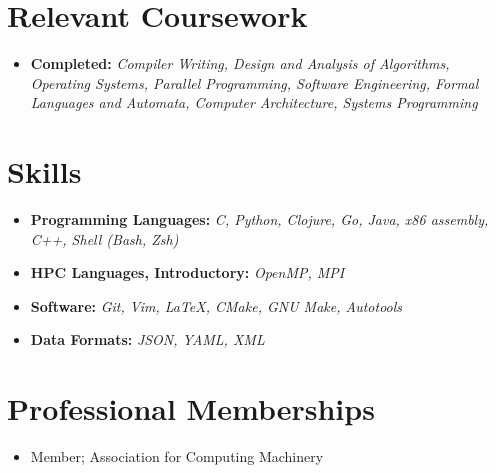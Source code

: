 \documentclass[10pt,letterpaper,sans]{moderncv}
\begin{document}
\section{Relevant Coursework}

\vspace{2pt}

\begin{itemize}
    \item{
        \textbf{Completed:}
        \textit{
            Compiler Writing, Design and Analysis of Algorithms, Operating
            Systems, Parallel Programming, Software Engineering, Formal
            Languages and Automata, Computer Architecture, Systems Programming
        }
    }
\end{itemize}

\section{Skills}

\vspace{2pt}

\begin{itemize}

    \item{
        \textbf{Programming Languages:}
        \textit{
            C, Python, Clojure, Go, Java,  x86 assembly, C++, Shell (Bash, Zsh)
        }
    }
    \vspace{3pt}
    \item{
        \textbf{HPC Languages, Introductory:}
        \textit{
            OpenMP, MPI
        }
    }
    \vspace{3pt}
    \item{
        \textbf{Software:}
        \textit{
            Git, Vim, \LaTeX, CMake, GNU Make, Autotools
        }
    }
    \vspace{3pt}
    \item {
        \textbf{Data Formats:}
        \textit{
            JSON, YAML, XML
        }
    }
\end{itemize}

\section{Professional Memberships}
\begin{itemize}
    \item {
            Member; Association for Computing Machinery
    }
\end{itemize}
\end{document}
